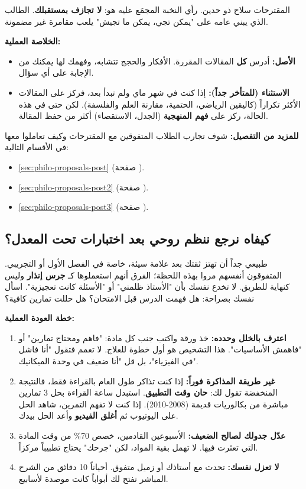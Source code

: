 \documentclass[12pt,a4paper]{book}
\begin{document}
		المقترحات سلاح ذو حدين. رأي النخبة المجمَع عليه هو: \textbf{لا تجازف بمستقبلك}. الطالب الذي يبني عامه على "يمكن تجي، يمكن ما تجيش" يلعب مقامرة غير مضمونة.
		
		\textbf{الخلاصة العملية:}
		\begin{itemize}
			\item \textbf{الأصل:} أدرس \textbf{كل} المقالات المقررة. الأفكار والحجج تتشابه، وفهمك لها يمكنك من الإجابة على أي سؤال.
			\item \textbf{الاستثناء (للمتأخر جداً):} إذا كنت في شهر ماي ولم تبدأ بعد، فركز على المقالات الأكثر تكراراً (كاليقين الرياضي، الحتمية، مقارنة العلم والفلسفة). لكن حتى في هذه الحالة، ركز على \textbf{فهم المنهجية} (الجدل، الاستقصاء) أكثر من حفظ المقالة.
		\end{itemize}
		
		\textbf{للمزيد من التفصيل:}
	 شوف تجارب الطلاب المتفوقين مع المقترحات وكيف تعاملوا معها في الأقسام التالية:
		\begin{itemize}
			\item \ref{sec:philo-proposals-post} (صفحة \pageref{sec:philo-proposals-post}).
			\item \ref{sec:philo-proposals-post2} (صفحة \pageref{sec:philo-proposals-post2}).
			\item \ref{sec:philo-proposals-post3} (صفحة \pageref{sec:philo-proposals-post3}).
		\end{itemize}
		
	\subsection*{كيفاه نرجع ننظم روحي بعد اختبارات تحت المعدل؟}
	
	طبيعي جداً أن تهتز ثقتك بعد علامة سيئة، خاصة في الفصل الأول أو التجريبي. المتفوقون أنفسهم مروا بهذه اللحظة؛ الفرق أنهم استعملوها كـ \textbf{جرس إنذار} وليس كنهاية للطريق. لا تخدع نفسك بأن "الأستاذ ظلمني" أو "الأسئلة كانت تعجيزية". اسأل نفسك بصراحة: هل فهمت الدرس قبل الامتحان؟ هل حللت تمارين كافية؟ 
	
	\textbf{خطة العودة العملية:}
	\begin{enumerate}
		\item \textbf{اعترف بالخلل وحدده:} خذ ورقة واكتب جنب كل مادة: "فاهم ومحتاج تمارين" أو "فاهمش الأساسيات". هذا التشخيص هو أول خطوة للعلاج. لا تعمم فتقول "أنا فاشل في الفيزياء"، بل قل "أنا ضعيف في وحدة الميكانيك".
		\item \textbf{غير طريقة المذاكرة فوراً:} إذا كنت تذاكر طول العام بالقراءة فقط، فالنتيجة المنخفضة تقول لك: \textbf{حان وقت التطبيق}. استبدل ساعة القراءة بحل 3 تمارين مباشرة من بكالوريات قديمة (2008-2010). إذا كنت لا تفهم التمرين، شاهد الحل على اليوتيوب ثم \textbf{أغلق الفيديو} وأعد الحل بيدك.
		\item \textbf{عدّل جدولك لصالح الضعيف:} الأسبوعين القادمين، خصص 70\% من وقت المادة التي تعثرت فيها. لا تهمل بقية المواد، لكن "جرحك" يحتاج تطبيباً مركزاً.
		\item \textbf{لا تعزل نفسك:} تحدث مع أستاذك أو زميل متفوق. أحياناً 10 دقائق من الشرح المباشر تفتح لك أبواباً كانت موصدة لأسابيع.
	\end{enumerate}
	
\end{document}
